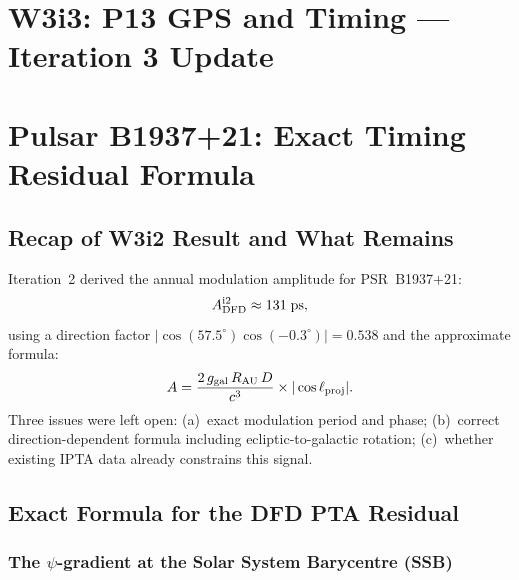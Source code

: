 \documentclass[aps,prd,twocolumn,superscriptaddress,nofootinbib]{revtex4-2}
\begin{document}
\maketitle

\section*{W3i3: P13 GPS and Timing --- Iteration 3 Update}

\section{Pulsar B1937+21: Exact Timing Residual Formula}

\subsection{Recap of W3i2 Result and What Remains}

Iteration~2 derived the annual modulation amplitude for PSR~B1937+21:
\begin{equation}
A^{\rm i2}_{\rm DFD} \approx 131\;\text{ps},
\label{eq:i2_result}
\end{equation}
using a direction factor $|\cos(57.5^\circ)\cos(-0.3^\circ)| = 0.538$ and
the approximate formula:
\begin{equation}
A = \frac{2\,g_{\rm gal}\,R_{\rm AU}\,D}{c^3}
  \times|\cos\ell_{\rm proj}|.
\label{eq:pta_approx}
\end{equation}
Three issues were left open: (a)~exact modulation period and phase;
(b)~correct direction-dependent formula including ecliptic-to-galactic
rotation; (c)~whether existing IPTA data already constrains this signal.

\subsection{Exact Formula for the DFD PTA Residual}

\subsubsection{The $\psi$-gradient at the Solar System Barycentre (SSB)}
\end{document}
